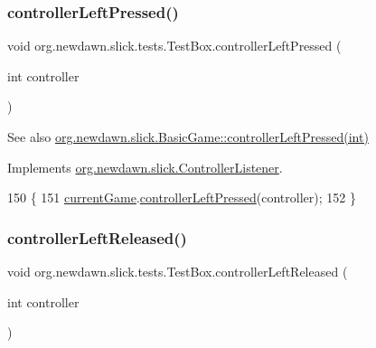 \subsubsection{\texorpdfstring{controller\+Left\+Pressed()}{controllerLeftPressed()}}
{\footnotesize\ttfamily void org.\+newdawn.\+slick.\+tests.\+Test\+Box.\+controller\+Left\+Pressed (\begin{DoxyParamCaption}\item[{int}]{controller }\end{DoxyParamCaption})\hspace{0.3cm}{\ttfamily [inline]}}

\begin{DoxySeeAlso}{See also}
\mbox{\hyperlink{classorg_1_1newdawn_1_1slick_1_1_basic_game_aef303720a5e704f28de381cd96f62467}{org.\+newdawn.\+slick.\+Basic\+Game\+::controller\+Left\+Pressed(int)}} 
\end{DoxySeeAlso}


Implements \mbox{\hyperlink{interfaceorg_1_1newdawn_1_1slick_1_1_controller_listener_abfb38c5d8e44b7613a49cbfaf19d5585}{org.\+newdawn.\+slick.\+Controller\+Listener}}.


\begin{DoxyCode}
150                                                       \{
151         \mbox{\hyperlink{classorg_1_1newdawn_1_1slick_1_1tests_1_1_test_box_a5e0fdb2f97173d828af597044c525078}{currentGame}}.\mbox{\hyperlink{classorg_1_1newdawn_1_1slick_1_1_basic_game_aef303720a5e704f28de381cd96f62467}{controllerLeftPressed}}(controller);
152     \}
\end{DoxyCode}
\mbox{\label{classorg_1_1newdawn_1_1slick_1_1tests_1_1_test_box_a52d79ff8a6f778651fff642b6d91b2de}} 
\subsubsection{\texorpdfstring{controller\+Left\+Released()}{controllerLeftReleased()}}
{\footnotesize\ttfamily void org.\+newdawn.\+slick.\+tests.\+Test\+Box.\+controller\+Left\+Released (\begin{DoxyParamCaption}\item[{int}]{controller }\end{DoxyParamCaption})\hspace{0.3cm}{\ttfamily [inline]}}

